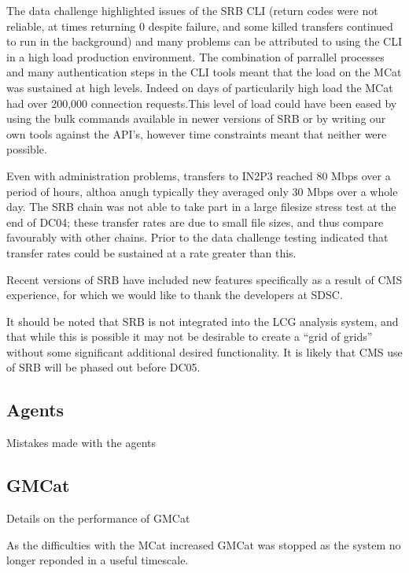 \documentclass{cmspaper}
\begin{document}
The data challenge highlighted issues of the SRB CLI (return codes were not 
reliable, at times returning 0 despite failure, and some killed transfers continued to 
run in the background) and many problems can be attributed to using the CLI in
a high load production environment. The combination of parrallel processes and
many authentication steps in the CLI tools meant that the load on the MCat was 
sustained at high levels. Indeed on days of particularily high load the MCat
had over 200,000 connection requests.This level of load could have been 
eased by using the bulk commands available in newer versions of SRB or by 
writing our own tools against the API's, however time constraints meant that 
neither were possible.

Even with administration problems, transfers to IN2P3 reached 80 Mbps
over a period of hours, althoa anugh typically they averaged only 30
Mbps over a whole day. The SRB chain was not able to take part in a
large filesize stress test at the end of DC04; these transfer rates
are due to small file sizes, and thus compare favourably with other
chains. Prior to the data challenge testing indicated that transfer
rates could be sustained at a rate greater than this.

Recent versions of SRB have included new features specifically as a 
result of CMS experience, for which we would like to thank the developers
at SDSC.

It should be noted that SRB is not integrated into the LCG analysis
system, and that while this is possible %
it may
not be desirable to create a ``grid of grids'' without some
significant additional desired functionality.  It is likely that CMS
use of SRB will be phased out before DC05.

\subsection{Agents}
Mistakes made with the agents
\subsection{GMCat}
Details on the performance of GMCat

As the difficulties with the MCat increased GMCat was stopped as the system 
no longer reponded in a useful timescale.
\end{document}
